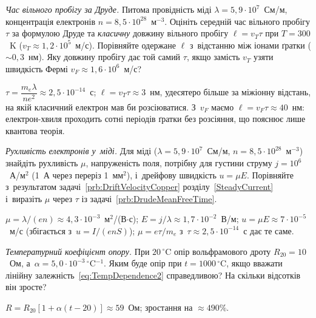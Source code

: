 
\begin{problem}\label{prb:DrudeMeanFreeTime}
	\emph{Час вільного пробігу за Друде.} Питома провідність міді
	$\lambda=5{,}9\cdot10^{7}$~См/м, концентрація електронів
	$n=8{,}5\cdot10^{28}$~м$^{-3}$. Оцініть середній час вільного пробігу $\tau$ за
	формулою Друде та \emph{класичну} довжину вільного пробігу $\ell=v_T\tau$ при
	$T=300$~K ($v_T\approx1{,}2\cdot10^5$~м/с). Порівняйте одержане $\ell$ з~відстанню між
	іонами ґратки ($\sim0{,}3$~нм). Яку довжину пробігу дає той самий $\tau$, якщо замість
	$v_T$ узяти швидкість Фермі $v_F\approx1{,}6\cdot10^{6}$~м/с?
	\begin{solution}
		$\tau=\dfrac{m_e\lambda}{ne^2}\approx2{,}5\cdot10^{-14}$~с; $\ell=v_T\tau\approx3$~нм, удесятеро більше за міжіонну відстань,
		на якій класичний електрон мав би розсіюватися. З~$v_F$ маємо $\ell=v_F\tau\approx40$~нм: електрон-хвиля проходить сотні
		періодів ґратки без розсіяння, що пояснює лише квантова теорія.
	\end{solution}
\end{problem}
\begin{problem}\label{prb:CopperMobility}
	\emph{Рухливість електронів у~міді.} Для міді ($\lambda=5{,}9\cdot10^{7}$~См/м,
	$n=8{,}5\cdot10^{28}$~м$^{-3}$) знайдіть рухливість $\mu$, напруженість поля, потрібну
	для густини струму $j=10^{6}$~А/м$^2$ (1~А через переріз 1~мм$^2$), і~дрейфову
	швидкість $u=\mu E$. Порівняйте з~результатом задачі~\ref{prb:DriftVelocityCopper}
	розділу~\ref{SteadyCurrent} і~виразіть $\mu$ через $\tau$ із
	задачі~\ref{prb:DrudeMeanFreeTime}.
	\begin{solution}
		$\mu=\lambda/(en)\approx4{,}3\cdot10^{-3}$~м$^2$/(В$\cdot$с); $E=j/\lambda\approx1{,}7\cdot10^{-2}$~В/м;
		$u=\mu E\approx7\cdot10^{-5}$~м/с (збігається з~$u=I/(enS)$); $\mu=e\tau/m_e$ з~$\tau\approx2{,}5\cdot10^{-14}$~с дає те саме.
	\end{solution}
\end{problem}
\begin{problem}\label{prb:TempCoefficient}
	\emph{Температурний коефіцієнт опору.} При $20\,^\circ$C опір вольфрамового дроту
	$R_{20}=10$~Ом, а~$\alpha=5{,}0\cdot10^{-3}\,{}^\circ$C$^{-1}$. Яким буде опір при
	$t=1000\,^\circ$C, якщо вважати лінійну залежність~\eqref{eq:TempDependence2}
	справедливою? На скільки відсотків він зросте?
	\begin{solution}
		$R=R_{20}[1+\alpha(t-20)]\approx59$~Ом; зростання на $\approx490\%$.
	\end{solution}
\end{problem}

